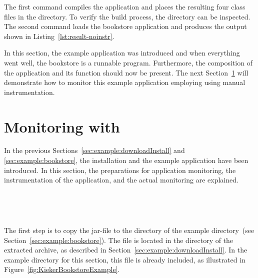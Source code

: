 \noindent The first command compiles the application and places the resulting four class files in the  directory. To verify the build process, the  directory can be inspected. The second command loads the bookstore application and produces the output shown in Listing~\ref{lst:result-noinstr}.



\noindent In this section, the \Kieker{} example application was introduced and when everything went well, the bookstore is a runnable program. Furthermore, the composition of the application and its function should now be present. %
The next Section~\ref{sec:example:monitoring} will demonstrate how %
to monitor this example application employing \KiekerMonitoringPart{} using manual instrumentation.

\pagebreak

\section{Monitoring with \KiekerMonitoringPart{}}\label{sec:example:monitoring}

In the previous Sections~\ref{sec:example:downloadInstall} and \ref{sec:example:bookstore}, the \Kieker{} installation and the example application have been introduced. In this section, the preparations for application monitoring, the instrumentation of the application, and the actual monitoring are explained.

\quad\


\

\noindent The first step is to copy the \Kieker{} jar-file \file{\mainJarEMF} to the  directory of the example directory~(see Section~\ref{sec:example:bookstore}). The file is located in the  directory of the extracted \Kieker{} archive, as described in Section~\ref{sec:example:downloadInstall}. %
In the example directory for this section, this file is already included, %
as illustrated in Figure~\ref{fig:KiekerBookstoreExample}.


